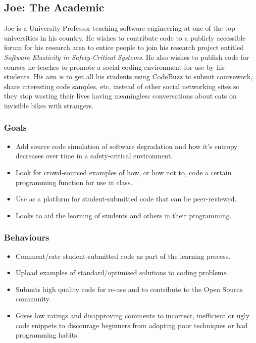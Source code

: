 \documentclass[11pt,a4paper]{article}
\begin{document}
\newpage

\subsection{Joe: The Academic}

Joe is a University Professor teaching software engineering at
one of the top universities in his country. He wishes to contribute
code to a publicly accessible forum for his research area to entice
people to join his research project entitled
\textit{Software Elasticity in Safety-Critical Systems}. He also wishes
to publish code for courses he teaches to promote a social coding
environment for use by his students. His aim is to get all his students
using CodeBuzz to submit coursework, share interesting code samples,
etc, instead of other social networking sites so they stop
wasting their lives having meaningless conversations about cats on
invisible bikes with strangers.

\subsubsection{Goals}

\begin{itemize}
\item Add source code simulation of software degradation and how it's
entropy decreases over time in a safety-critical environment.
\item Look for crowd-sourced examples of how, or how not to, code a certain
programming function for use in class.
\item Use as a platform for student-submitted code that can be peer-reviewed.
\item Looks to aid the learning of students and others in their programming.
\end{itemize}

\subsubsection{Behaviours}

\begin{itemize}
\item Comment/rate student-submitted code as part of the learning process.
\item Upload examples of standard/optimised solutions to coding problems.
\item Submits high quality code for re-use and to contribute to the Open
Source community.
\item Gives low ratings and disapproving comments to incorrect,
inefficient or ugly code snippets to discourage beginners from
adopting poor techniques or bad programming habits.
\end{itemize}
\end{document}
